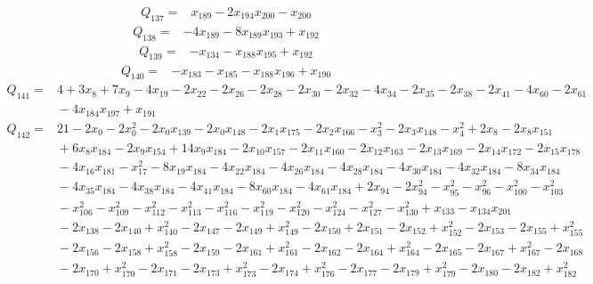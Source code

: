 {\begin{align*}
 Q_{137}={}&x_{189} -2x_{194}x_{200} -x_{200}
\end{align*}
\begin{align*}
 Q_{138}={}&-4x_{189} -8x_{189}x_{193} +x_{192}
\end{align*}
\begin{align*}
 Q_{139}={}&-x_{134} -x_{188}x_{195} +x_{192}
\end{align*}
\begin{align*}
 Q_{140}={}&-x_{183} -x_{185} -x_{188}x_{196} +x_{190}
\end{align*}
\begin{align*}
 Q_{141}={}&4 +3x_{8} +7x_{9} -4x_{19} -2x_{22} -2x_{26} -2x_{28} -2x_{30} -2x_{32} -4x_{34} -2x_{35} -2x_{38} -2x_{41} -4x_{60} -2x_{61}\\
 &{}-4x_{184}x_{197} +x_{191}
\end{align*}
\begin{align*}
 Q_{142}={}&21 -2x_{0} -2x_{0}^{2} -2x_{0}x_{139} -2x_{0}x_{148} -2x_{1}x_{175} -2x_{2}x_{166} -x_{3}^{2} -2x_{3}x_{148} -x_{4}^{2} +2x_{8} -2x_{8}x_{151}\\
 &{}+6x_{8}x_{184} -2x_{9}x_{154} +14x_{9}x_{184} -2x_{10}x_{157} -2x_{11}x_{160} -2x_{12}x_{163} -2x_{13}x_{169} -2x_{14}x_{172} -2x_{15}x_{178}\\
 &{}-4x_{16}x_{181} -x_{17}^{2} -8x_{19}x_{184} -4x_{22}x_{184} -4x_{26}x_{184} -4x_{28}x_{184} -4x_{30}x_{184} -4x_{32}x_{184} -8x_{34}x_{184}\\
 &{}-4x_{35}x_{184} -4x_{38}x_{184} -4x_{41}x_{184} -8x_{60}x_{184} -4x_{61}x_{184} +2x_{94} -2x_{94}^{2} -x_{95}^{2} -x_{96}^{2} -x_{100}^{2} -x_{103}^{2}\\
 &{}-x_{106}^{2} -x_{109}^{2} -x_{112}^{2} -x_{113}^{2} -x_{116}^{2} -x_{119}^{2} -x_{120}^{2} -x_{124}^{2} -x_{127}^{2} -x_{130}^{2} +x_{133} -x_{134}x_{201}\\
 &{}-2x_{138} -2x_{140} +x_{140}^{2} -2x_{147} -2x_{149} +x_{149}^{2} -2x_{150} +2x_{151} -2x_{152} +x_{152}^{2} -2x_{153} -2x_{155} +x_{155}^{2}\\
 &{}-2x_{156} -2x_{158} +x_{158}^{2} -2x_{159} -2x_{161} +x_{161}^{2} -2x_{162} -2x_{164} +x_{164}^{2} -2x_{165} -2x_{167} +x_{167}^{2} -2x_{168}\\
 &{}-2x_{170} +x_{170}^{2} -2x_{171} -2x_{173} +x_{173}^{2} -2x_{174} +x_{176}^{2} -2x_{177} -2x_{179} +x_{179}^{2} -2x_{180} -2x_{182} +x_{182}^{2}\\

\end{align*}}
